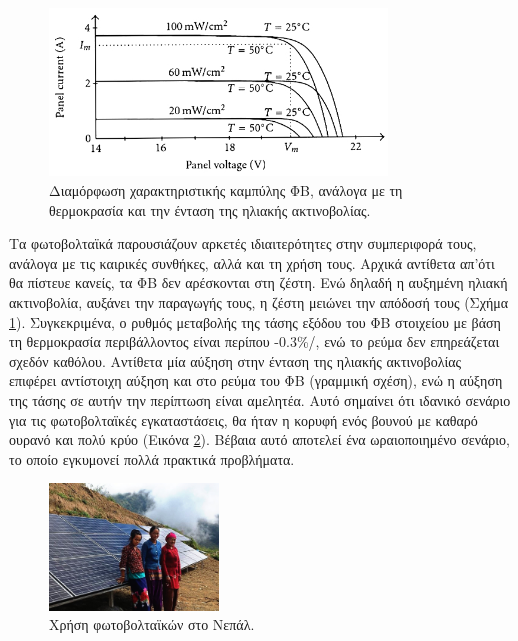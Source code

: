 \documentclass[12pt]{report}
\begin{document}
\begin{figure}[h]
				\center
				\includegraphics[width=0.8\textwidth]{ivcurve}
				\captionsetup{width=0.9\textwidth}
				\caption{Διαμόρφωση χαρακτηριστικής καμπύλης {} ΦΒ, ανάλογα με τη θερμοκρασία και την ένταση της ηλιακής ακτινοβολίας.}
				\label{fig:ivcurve}
\end{figure}

Τα φωτοβολταϊκά παρουσιάζουν αρκετές ιδιαιτερότητες στην συμπεριφορά τους, ανάλογα με τις καιρικές συνθήκες, αλλά και τη χρήση τους. Αρχικά αντίθετα απ'ότι θα πίστευε κανείς, τα ΦΒ δεν αρέσκονται στη ζέστη. Ενώ δηλαδή η αυξημένη 
ηλιακή ακτινοβολία, αυξάνει την παραγωγής τους, η ζέστη μειώνει την απόδοσή τους (Σχήμα \ref{fig:ivcurve}). Συγκεκριμένα, ο ρυθμός μεταβολής της τάσης εξόδου του ΦΒ στοιχείου με βάση τη θερμοκρασία περιβάλλοντος είναι περίπου 
-0.3\%/{}, ενώ το ρεύμα δεν επηρεάζεται σχεδόν καθόλου. Αντίθετα μία αύξηση στην ένταση της ηλιακής ακτινοβολίας επιφέρει αντίστοιχη αύξηση και στο ρεύμα του ΦΒ (γραμμική σχέση), ενώ η αύξηση της τάσης σε αυτήν την 
περίπτωση είναι αμελητέα. Αυτό σημαίνει ότι ιδανικό σενάριο για τις φωτοβολταϊκές εγκαταστάσεις, θα ήταν η κορυφή ενός βουνού με καθαρό ουρανό και πολύ κρύο (Εικόνα \ref{fig:nepal}). Βέβαια αυτό αποτελεί ένα ωραιοποιημένο σενάριο, 
το οποίο εγκυμονεί πολλά πρακτικά προβλήματα. 

\begin{figure}[h]
				\center
				\includegraphics[width=0.4\textwidth]{nepal}
				\captionsetup{name=Εικόνα}
				\caption{Χρήση φωτοβολταϊκών στο Νεπάλ.}
				\label{fig:nepal}
\end{figure}
\end{document}
